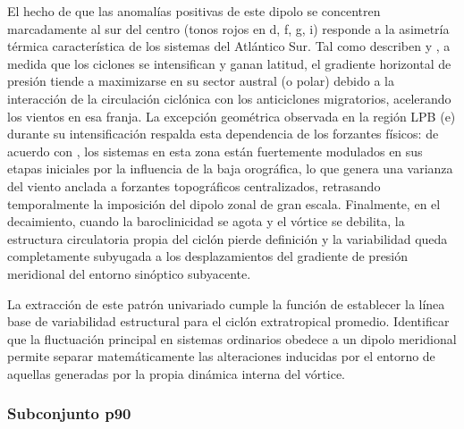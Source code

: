 El hecho de que las anomalías positivas de este dipolo se concentren marcadamente al sur del centro (tonos rojos en d, f, g, i) responde a la asimetría térmica característica de los sistemas del Atlántico Sur. Tal como describen \citet{sinclair1997objective} y \citet{reboita2010south}, a medida que los ciclones se intensifican y ganan latitud, el gradiente horizontal de presión tiende a maximizarse en su sector austral (o polar) debido a la interacción de la circulación ciclónica con los anticiclones migratorios, acelerando los vientos en esa franja. 
La excepción geométrica observada en la región LPB (e) durante su intensificación respalda esta dependencia de los forzantes físicos: de acuerdo con \citet{gramcianinov2019properties}, los sistemas en esta zona están fuertemente modulados en sus etapas iniciales por la influencia de la baja orográfica, lo que genera una varianza del viento anclada a forzantes topográficos centralizados, retrasando temporalmente la imposición del dipolo zonal de gran escala. Finalmente, en el decaimiento, cuando la baroclinicidad se agota y el vórtice se debilita, la estructura circulatoria propia del ciclón pierde definición y la variabilidad queda completamente subyugada a los desplazamientos del gradiente de presión meridional del entorno sinóptico subyacente.

La extracción de este patrón univariado cumple la función de establecer la línea base de variabilidad estructural para el ciclón extratropical promedio. Identificar que la fluctuación principal en sistemas ordinarios obedece a un dipolo meridional permite separar matemáticamente las alteraciones inducidas por el entorno de aquellas generadas por la propia dinámica interna del vórtice.

\subsubsection{Subconjunto p90}\label{subsubsec:eof1_wind10_p90}

